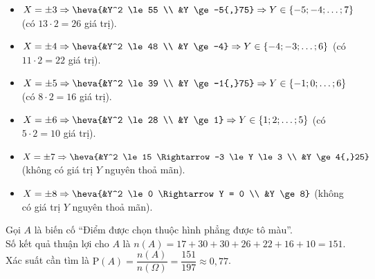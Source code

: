 \begin{ex}
{\begin{itemize}
			\item $X = \pm 3 \Rightarrow \heva{&Y^2 \le 55 \\ &Y \ge -5{,}75} \Rightarrow Y \in \{-5; -4; \dots; 7\}$ (có $13 \cdot 2 = 26$ giá trị).
			\item $X = \pm 4 \Rightarrow \heva{&Y^2 \le 48 \\ &Y \ge -4} \Rightarrow Y \in \{-4; -3; \dots; 6\}$ (có $11 \cdot 2 = 22$ giá trị).
			\item $X = \pm 5 \Rightarrow \heva{&Y^2 \le 39 \\ &Y \ge -1{,}75} \Rightarrow Y \in \{-1; 0; \dots; 6\}$ (có $8 \cdot 2 = 16$ giá trị).
			\item $X = \pm 6 \Rightarrow \heva{&Y^2 \le 28 \\ &Y \ge 1} \Rightarrow Y \in \{1; 2; \dots; 5\}$ (có $5 \cdot 2 = 10$ giá trị).
			\item $X = \pm 7 \Rightarrow \heva{&Y^2 \le 15 \Rightarrow -3 \le Y \le 3 \\ &Y \ge 4{,}25}$ (không có giá trị $Y$ nguyên thoả mãn).
			\item $X = \pm 8 \Rightarrow \heva{&Y^2 \le 0 \Rightarrow Y = 0 \\ &Y \ge 8}$ (không có giá trị $Y$ nguyên thoả mãn).
		\end{itemize}
		Gọi $A$ là biến cố ``Điểm được chọn thuộc hình phẳng được tô màu''.\\
		Số kết quả thuận lợi cho $A$ là $n(A) = 17 + 30 + 30 + 26 + 22 + 16 + 10 = 151$.\\
		Xác suất cần tìm là $\mathrm{P}(A) = \dfrac{n(A)}{n(\Omega)} = \dfrac{151}{197} \approx 0{,}77$.
	}
\end{ex}


